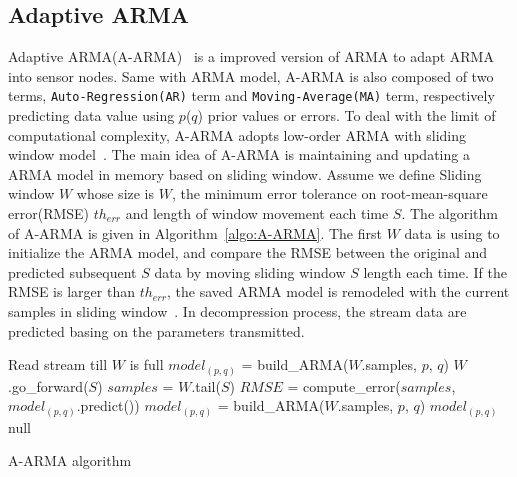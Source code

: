 \subsection{Adaptive ARMA}
Adaptive ARMA(A-ARMA)~\cite{lu2010optimized} is a improved version of ARMA to
adapt ARMA into sensor nodes. Same with ARMA model, A-ARMA is also composed of
two terms, \texttt{Auto-Regression(AR)} term and \texttt{Moving-Average(MA)}
term, respectively predicting data value using $p$($q$) prior values or errors.
To deal with the limit of computational complexity, A-ARMA adopts low-order ARMA
with sliding window model~\cite{lu2010optimized}. The main idea of A-ARMA is
maintaining and updating a ARMA model in memory based on sliding window. Assume
we define Sliding window $W$ whose size is $W$, the minimum error tolerance on
root-mean-square error(RMSE) $th_{err}$ and length of window movement each time
$S$. The algorithm of A-ARMA is given in Algorithm~\ref{algo:A-ARMA}. The first
$W$ data is using to initialize the ARMA model, and compare the RMSE between the
original and predicted subsequent $S$ data by moving sliding window $S$ length
each time. If the RMSE is larger than $th_{err}$, the saved ARMA model is
remodeled with the current samples in sliding window~\cite{lu2010optimized}. In
decompression process, the stream data are predicted basing on the parameters
transmitted.

\begin{algorithm}
\begin{algorithmic}[1]
\Input
\EndInput
\Output
\EndOutput

\State Read stream till $W$ is full 
\State $model_{(p, q)}$ = build\_ARMA($W$.samples, $p$, $q$)  
    \State $W$.go\_forward($S$) 
    \State $samples$ = $W$.tail($S$)    
    \State $RMSE$ = compute\_error($samples$,  $model_{(p, q)}$.predict())
        \State $model_{(p, q)}$ = build\_ARMA($W$.samples, $p$, $q$)
        \State \Return $model_{(p, q)}$ 
    \Else
        \State \Return null 
    \EndIf
\EndWhile
\end{algorithmic}
\caption{A-ARMA algorithm}
\label{algo:A-ARMA}
\end{algorithm}

